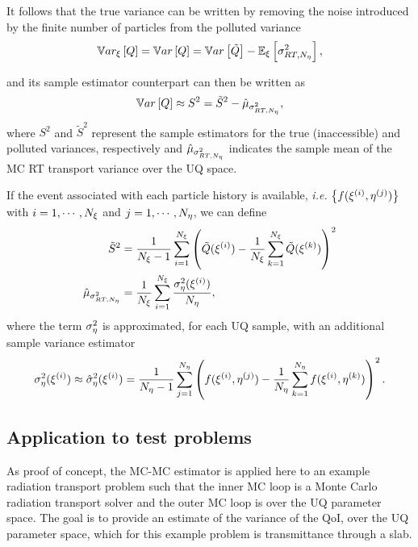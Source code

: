 It follows that the true variance can be written by removing the noise introduced by the finite number of particles from the polluted variance
\begin{equation}
\label{kbc:eq:evade_theory}
 \mathbb{V}ar_{\xi}\left[Q\right] = \mathbb{V}ar\left[Q\right] = \mathbb{V}ar\left[\tilde{Q}\right] - \mathbb{E}_\xi\left[ \sigma^2_{RT,N_\eta} \right],
\end{equation}

\noindent and its sample estimator counterpart can then be written as
\begin{equation}
\label{eq:evade_sampling}
 \mathbb{V}ar\left[Q\right] \approx S^2 = \tilde{S}^2 - \hat{\mu}_{\sigma^2_{RT,N_\eta}},
\end{equation}
where $S^2$ and $\tilde{S}^2$ represent the sample estimators for the true (inaccessible) and polluted variances, respectively and $\hat{\mu}_{\sigma^2_{RT,N_\eta}}$ indicates the sample mean of the MC RT transport variance over the UQ space. 

If the event associated with each particle history is available, \textit{i.e.} $\left\{ f(\xi^{(i)},\eta^{(j)}) \right\}$ with $i=1,\cdots, N_\xi$ and $j=1,\cdots,N_\eta$, we can define 
\begin{equation}
\begin{split}
 \tilde{S}^2 &= \frac{1}{N_\xi-1} \sum_{i=1}^{N_\xi} \left( \tilde{Q}(\xi^{(i)}) - \frac{1}{N_\xi} \sum_{k=1}^{N_\xi} \tilde{Q}(\xi^{(k)}) \right)^2 \\
 \hat{\mu}_{\sigma^2_{RT,N_\eta}} &= \frac{1}{N_\xi} \sum_{i=1}^{N_\xi} \frac{\sigma^2_\eta(\xi^{(i)})}{N_\eta},
\end{split} 
\end{equation}
where the term $\sigma^2_\eta$ is approximated, for each UQ sample, with an additional sample variance estimator
\begin{equation}
 \sigma^2_\eta(\xi^{(i)}) \approx \hat{\sigma}^2_\eta(\xi^{(i)}) =\frac{1}{N_\eta-1} \sum_{j=1}^{N_\eta} \left( f(\xi^{(i)},\eta^{(j)}) - \frac{1}{N_\eta} \sum_{k=1}^{N_\eta} f(\xi^{(i)},\eta^{(k)}) \right)^2. 
\end{equation}



\subsection{Application to test problems}
As proof of concept, the MC-MC estimator is applied here to an example radiation transport problem such that the inner MC loop is a Monte Carlo radiation transport solver and the outer MC loop is over the UQ parameter space. The goal is to provide an estimate of the variance of the QoI, over the UQ parameter space, which for this example problem is transmittance through a slab.

